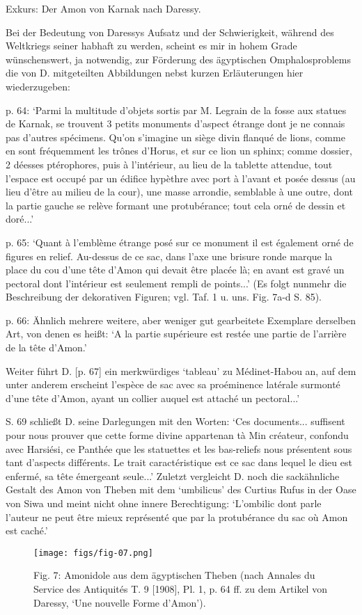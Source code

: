 \documentclass[a4paper, 11pt, oneside]{article}
\begin{document}
Exkurs: Der Amon von Karnak nach Daressy.

Bei der Bedeutung von Daressys Aufsatz und der Schwierigkeit, während des Weltkriegs seiner habhaft zu werden, scheint es mir in hohem Grade wünschenswert, ja notwendig, zur Förderung des ägyptischen Omphalosproblems die von D. mitgeteilten Abbildungen nebst kurzen Erläuterungen hier wiederzugeben:

p. 64: `Parmi la multitude d'objets sortis par M. Legrain de la fosse aux statues de Karnak, se trouvent 3 petits monuments d'aspect étrange dont je ne connais pas d'autres spécimens. Qu'on s'imagine un siège divin flanqué de lions, comme en sont fréquemment les trônes d'Horus, et sur ce lion un sphinx; comme dossier, 2 déesses ptérophores, puis à l'intérieur, au lieu de la tablette attendue, tout l'espace est occupé par un édifice hypèthre avec port à l'avant et posée dessus (au lieu d'être au milieu de la cour), une masse arrondie, semblable à une outre, dont la partie gauche se relève formant une protubérance; tout cela orné de dessin et doré...'

p. 65: `Quant à l'emblème étrange posé sur ce monument il est également orné de figures en relief. Au-dessus de ce sac, dans l'axe une brisure ronde marque la place du cou d'une tête d'Amon qui devait être placée là; en avant est gravé un pectoral dont l'intérieur est seulement rempli de points...' (Es folgt nunmehr die Beschreibung der dekorativen Figuren; vgl. Taf. 1 u. uns. Fig. 7a-d S. 85).

p. 66: Ähnlich mehrere weitere, aber weniger gut gearbeitete Exemplare derselben Art, von denen es heißt: `A la partie supérieure est restée une partie de l'arrière de la tête d'Amon.'

Weiter führt D. [p. 67] ein merkwürdiges `tableau' zu Médinet-Habou an, auf dem unter anderem erscheint l'espèce de sac avec sa proéminence latérale surmonté d'une tête d'Amon, ayant un collier auquel est attaché un pectoral...'

S. 69 schließt D. seine Darlegungen mit den Worten: `Ces documents... suffisent pour nous prouver que cette forme divine appartenan tà Min créateur, confondu avec Harsiési, ce Panthée que les statuettes et les bas-reliefs nous présentent sous tant d'aspects différents. Le trait caractéristique est ce sac dans lequel le dieu est enfermé, sa tête émergeant seule...' Zuletzt vergleicht D. noch die sackähnliche Gestalt des Amon von Theben mit dem `umbilicus' des Curtius Rufus in der Oase von Siwa und meint nicht ohne innere Berechtigung: `L'ombilic dont parle l'auteur ne peut être mieux représenté que par la protubérance du sac où Amon est caché.'
\clearpage
\vspace*{\fill}
\begin{figure}[H]
\centering
\texttt{[image: figs/fig-07.png]}
\caption{Fig. 7: Amonidole aus dem ägyptischen Theben (nach Annales du Service des Antiquités T. 9 [1908], Pl. 1, p. 64 ff. zu dem Artikel von Daressy, `Une nouvelle Forme d'Amon').}
\end{figure}
\vspace*{\fill}
\clearpage
\end{document}
